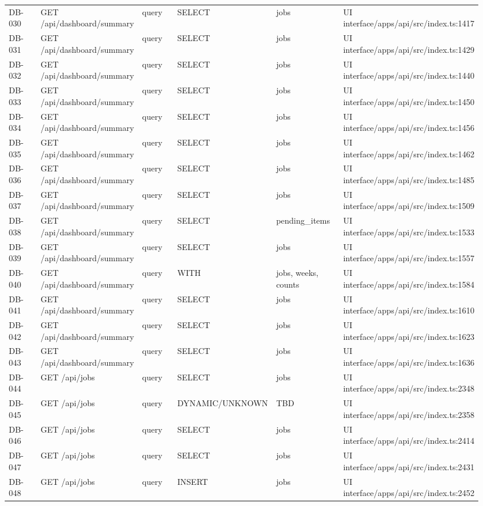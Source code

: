 \documentclass[11pt]{article}
\begin{document}
\begin{longtable}{p{0.10\linewidth}p{0.19\linewidth}p{0.10\linewidth}p{0.18\linewidth}p{0.16\linewidth}p{0.21\linewidth}}
DB-030 & GET /api/dashboard/summary & query & SELECT & jobs & UI interface/apps/api/src/index.ts:1417 \\
DB-031 & GET /api/dashboard/summary & query & SELECT & jobs & UI interface/apps/api/src/index.ts:1429 \\
DB-032 & GET /api/dashboard/summary & query & SELECT & jobs & UI interface/apps/api/src/index.ts:1440 \\
DB-033 & GET /api/dashboard/summary & query & SELECT & jobs & UI interface/apps/api/src/index.ts:1450 \\
DB-034 & GET /api/dashboard/summary & query & SELECT & jobs & UI interface/apps/api/src/index.ts:1456 \\
DB-035 & GET /api/dashboard/summary & query & SELECT & jobs & UI interface/apps/api/src/index.ts:1462 \\
DB-036 & GET /api/dashboard/summary & query & SELECT & jobs & UI interface/apps/api/src/index.ts:1485 \\
DB-037 & GET /api/dashboard/summary & query & SELECT & jobs & UI interface/apps/api/src/index.ts:1509 \\
DB-038 & GET /api/dashboard/summary & query & SELECT & pending\_items & UI interface/apps/api/src/index.ts:1533 \\
DB-039 & GET /api/dashboard/summary & query & SELECT & jobs & UI interface/apps/api/src/index.ts:1557 \\
DB-040 & GET /api/dashboard/summary & query & WITH & jobs, weeks, counts & UI interface/apps/api/src/index.ts:1584 \\
DB-041 & GET /api/dashboard/summary & query & SELECT & jobs & UI interface/apps/api/src/index.ts:1610 \\
DB-042 & GET /api/dashboard/summary & query & SELECT & jobs & UI interface/apps/api/src/index.ts:1623 \\
DB-043 & GET /api/dashboard/summary & query & SELECT & jobs & UI interface/apps/api/src/index.ts:1636 \\
DB-044 & GET /api/jobs & query & SELECT & jobs & UI interface/apps/api/src/index.ts:2348 \\
DB-045 & GET /api/jobs & query & DYNAMIC/UNKNOWN & TBD & UI interface/apps/api/src/index.ts:2358 \\
DB-046 & GET /api/jobs & query & SELECT & jobs & UI interface/apps/api/src/index.ts:2414 \\
DB-047 & GET /api/jobs & query & SELECT & jobs & UI interface/apps/api/src/index.ts:2431 \\
DB-048 & GET /api/jobs & query & INSERT & jobs & UI interface/apps/api/src/index.ts:2452 \\

\end{longtable}
\end{document}
